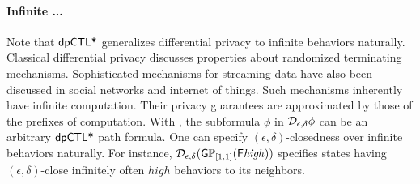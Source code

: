 \paragraph{Infinite ...}
Note that $\textsf{dpCTL*}$ generalizes differential privacy to infinite
behaviors naturally. Classical differential privacy discusses properties about
randomized terminating mechanisms. Sophisticated mechanisms for
streaming data have also been discussed in social networks and
internet of things. Such mechanisms inherently have infinite
computation. Their privacy guarantees are approximated by those of the
prefixes of computation.
With \dpCTL, the subformula $\phi$ in $\mathcal{D}_{{\epsilon}, {\delta}} \phi$
can be an arbitrary $\textsf{dpCTL*}$ path formula. One can specify
$(\epsilon, \delta)$-closedness over infinite behaviors naturally. For instance,
$\mathcal{D}_{{\epsilon}, {\delta}} (\mathsf{G} \mathbb{P}_{[1,1]} (\mathsf{F} \mathit{high}))$ 
specifies states having $(\epsilon, \delta)$-close
infinitely often $\mathit{high}$ behaviors to its neighbors.





